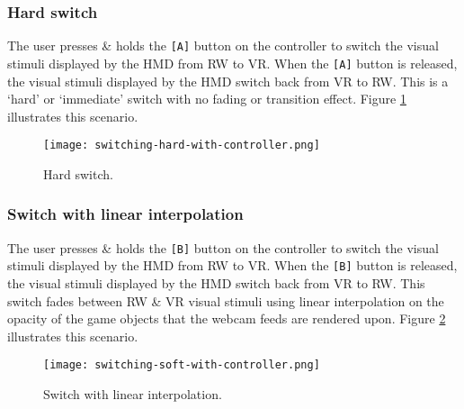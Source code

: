 
\subsubsection{Hard switch}
\label{sub-hardswitch}
The user presses \& holds the \texttt{[A]} button on the controller to switch the visual stimuli displayed by the HMD from RW to VR. When the \texttt{[A]} button is released, the visual stimuli displayed by the HMD switch back from VR to RW. This is a `hard' or `immediate' switch with no fading or transition effect. Figure \ref{scenario1} illustrates this scenario.

\begin{figure}[h]
	\begin{center}
		\texttt{[image: switching-hard-with-controller.png]}
		\caption{Hard switch.}
		\label{scenario1}
	\end{center}
\end{figure}


\subsubsection{Switch with linear interpolation}
The user presses \& holds the \texttt{[B]} button on the controller to switch the visual stimuli displayed by the HMD from RW to VR. When the \texttt{[B]} button is released, the visual stimuli displayed by the HMD switch back from VR to RW. This switch fades between RW \& VR  visual stimuli using linear interpolation on the opacity of the game objects that the webcam feeds are rendered upon. Figure \ref{scenario12} illustrates this scenario.

\begin{figure}[h]
	\begin{center}
		\texttt{[image: switching-soft-with-controller.png]}
		\caption{Switch with linear interpolation.}
		\label{scenario12}
	\end{center}
\end{figure}



